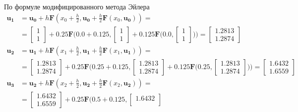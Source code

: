 \documentclass[a4paper, 12pt]{article}
\begin{document}
\begin{enumerate}
			По формуле модифицированного метода Эйлера
			\begin{align*}
				\mathbf{u_1}&=\mathbf{u_0} + h\mathbf{F}(x_0 + \frac{h}{2}, \mathbf{u_0}+\frac{h}{2}\mathbf{F}(x_0,\mathbf{u_0}))=\\&=
				\begin{bmatrix}
					1\\
					1
				\end{bmatrix} + 0.25\mathbf{F}\bigg(0.0 + 0.125, 
				\begin{bmatrix}
					1\\
					1
				\end{bmatrix} + 0.125\mathbf{F}\bigg(0.0, 
				\begin{bmatrix}
					1\\
					1
				\end{bmatrix}\bigg)\bigg)=
				\begin{bmatrix}
					1.2813\\
					1.2874
				\end{bmatrix}\\
				\mathbf{u_2}&=\mathbf{u_1} + h\mathbf{F}(x_1 + \frac{h}{2}, \mathbf{u_1}+\frac{h}{2}\mathbf{F}(x_1,\mathbf{u_1}))=\\&=
				\begin{bmatrix}
					1.2813\\
					1.2874
				\end{bmatrix} + 0.25\mathbf{F}\bigg(0.25 + 0.125, 
				\begin{bmatrix}
					1.2813\\
					1.2874
				\end{bmatrix} + 0.125\mathbf{F}\bigg(0.25, 
				\begin{bmatrix}
					1.2813\\
					1.2874
				\end{bmatrix}\bigg)\bigg)=
				\begin{bmatrix}
					1.6432\\
					1.6559
				\end{bmatrix}\\
				\mathbf{u_3}&=\mathbf{u_2} + h\mathbf{F}(x_2 + \frac{h}{2}, \mathbf{u_2}+\frac{h}{2}\mathbf{F}(x_2,\mathbf{u_2}))=\\&=
				\begin{bmatrix}
					1.6432\\
					1.6559
				\end{bmatrix} + 0.25\mathbf{F}\bigg(0.5 + 0.125, 
				\begin{bmatrix}
					1.6432\\

\end{bmatrix}
\end{align*}
\end{enumerate}
\end{document}
